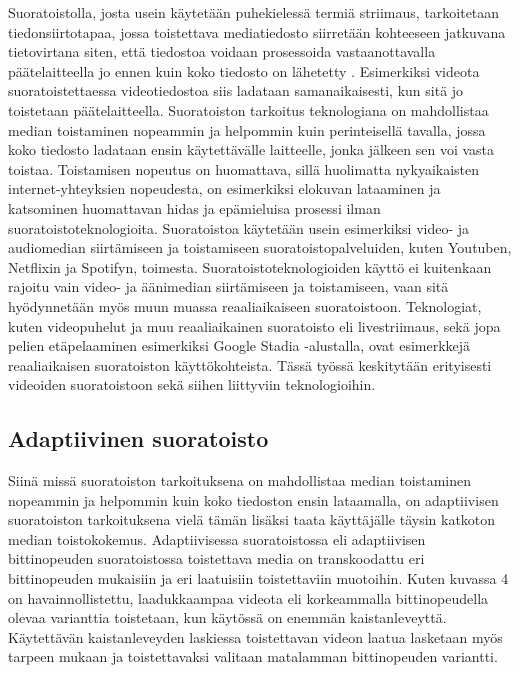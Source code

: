 \documentclass[finnish, 12pt, a4paper, elec, utf8, a-1b, online]{aaltothesis}
\begin{document}
Suoratoistolla, josta usein käytetään puhekielessä termiä striimaus, tarkoitetaan tiedonsiirtotapaa, jossa toistettava mediatiedosto siirretään kohteeseen jatkuvana tietovirtana siten, että tiedostoa voidaan prosessoida vastaanottavalla päätelaitteella jo ennen kuin koko tiedosto on lähetetty \cite{Britannica}. Esimerkiksi videota suoratoistettaessa videotiedostoa siis ladataan samanaikaisesti, kun sitä jo toistetaan päätelaitteella. Suoratoiston tarkoitus teknologiana on mahdollistaa median toistaminen nopeammin ja helpommin kuin perinteisellä tavalla, jossa koko tiedosto ladataan ensin käytettävälle laitteelle, jonka jälkeen sen voi vasta toistaa. Toistamisen nopeutus on huomattava, sillä huolimatta nykyaikaisten internet-yhteyksien nopeudesta, on esimerkiksi elokuvan lataaminen ja katsominen huomattavan hidas ja epämieluisa prosessi ilman suoratoistoteknologioita. Suoratoistoa käytetään usein esimerkiksi video- ja audiomedian siirtämiseen ja toistamiseen suoratoistopalveluiden, kuten Youtuben, Netflixin ja Spotifyn, toimesta. Suoratoistoteknologioiden käyttö ei kuitenkaan rajoitu vain video- ja äänimedian siirtämiseen ja toistamiseen, vaan sitä hyödynnetään myös muun muassa reaaliaikaiseen suoratoistoon. Teknologiat, kuten videopuhelut ja muu reaaliaikainen suoratoisto eli livestriimaus, sekä jopa pelien etäpelaaminen esimerkiksi Google Stadia -alustalla, \cite{Stadia} ovat esimerkkejä reaaliaikaisen suoratoiston käyttökohteista. Tässä työssä keskitytään erityisesti videoiden suoratoistoon sekä siihen liittyviin teknologioihin.

\subsection*{Adaptiivinen suoratoisto}

\noindent Siinä missä suoratoiston tarkoituksena on mahdollistaa median toistaminen nopeammin ja helpommin kuin koko tiedoston ensin lataamalla, on adaptiivisen suoratoiston tarkoituksena vielä tämän lisäksi taata käyttäjälle täysin katkoton median toistokokemus. Adaptiivisessa suoratoistossa eli adaptiivisen bittinopeuden suoratoistossa toistettava media on transkoodattu eri bittinopeuden mukaisiin ja eri laatuisiin toistettaviin muotoihin. Kuten kuvassa 4 on havainnollistettu, laadukkaampaa videota eli korkeammalla bittinopeudella olevaa varianttia toistetaan, kun käytössä on enemmän kaistanleveyttä. Käytettävän kaistanleveyden laskiessa toistettavan videon laatua lasketaan myös tarpeen mukaan ja toistettavaksi valitaan matalamman bittinopeuden variantti. \\
\end{document}
